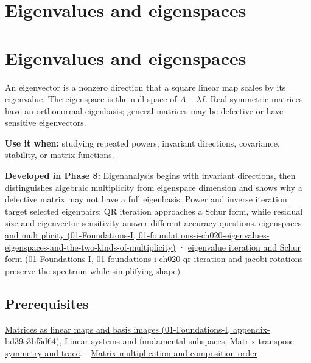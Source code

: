 \hypertarget{appendix-0b3be18411f9}{}
\section*{Eigenvalues and eigenspaces}
\section{Eigenvalues and eigenspaces}\label{appendix-0b3be18411f9-eigenvalues-and-eigenspaces}

An eigenvector is a nonzero direction that a square linear map scales by its eigenvalue. The eigenspace is the null space of \(A-\lambda I\). Real symmetric matrices have an orthonormal eigenbasis; general matrices may be defective or have sensitive eigenvectors.

\textbf{Use it when:} studying repeated powers, invariant directions, covariance, stability, or matrix functions.

\textbf{Developed in Phase 8:} Eigenanalysis begins with invariant directions, then distinguishes algebraic multiplicity from eigenspace dimension and shows why a defective matrix may not have a full eigenbasis. Power and inverse iteration target selected eigenpairs; QR iteration approaches a Schur form, while residual size and eigenvector sensitivity answer different accuracy questions. \href{../01-Foundations-I/main.pdf\#nameddest=01-foundations-i-ch020-eigenvalues-eigenspaces-and-the-two-kinds-of-multiplicity}{eigenspaces and multiplicity (01-Foundations-I, 01-foundations-i-ch020-eigenvalues-eigenspaces-and-the-two-kinds-of-multiplicity)} · \href{../01-Foundations-I/main.pdf\#nameddest=01-foundations-i-ch020-qr-iteration-and-jacobi-rotations-preserve-the-spectrum-while-simplifying-shape}{eigenvalue iteration and Schur form (01-Foundations-I, 01-foundations-i-ch020-qr-iteration-and-jacobi-rotations-preserve-the-spectrum-while-simplifying-shape)}

\subsection{Prerequisites}\label{appendix-0b3be18411f9-prerequisites}

\href{../01-Foundations-I/main.pdf\#nameddest=appendix-bd39c3bf5d64}{Matrices as linear maps and basis images (01-Foundations-I, appendix-bd39c3bf5d64)}, \hyperref[appendix-8572a4a060c1]{Linear systems and fundamental subspaces}, \hyperref[appendix-175ca5ff874d]{Matrix transpose symmetry and trace}. - \hyperref[appendix-ab31ef447dbf]{Matrix multiplication and composition order}

